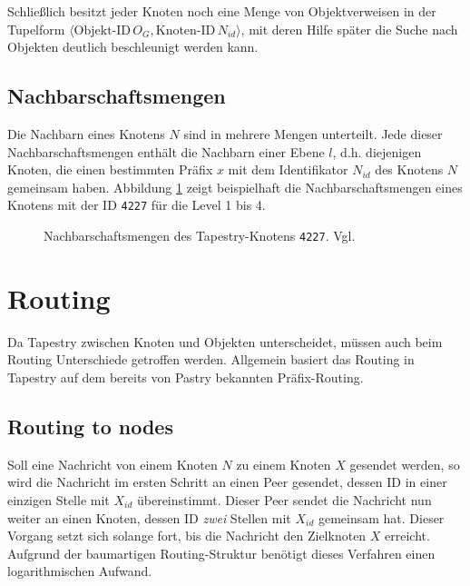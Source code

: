Schließlich besitzt jeder Knoten noch eine Menge von Objektverweisen in der 
Tupelform $\langle \text{Objekt-ID} \, O_G, \text{Knoten-ID} \, N_{id} 
\rangle$, mit deren Hilfe später die Suche nach Objekten deutlich beschleunigt 
werden kann.

\subsection{Nachbarschaftsmengen}
Die Nachbarn eines Knotens $N$ sind in mehrere Mengen unterteilt. Jede dieser 
Nachbarschaftsmengen enthält die Nachbarn einer Ebene $l$, d.h. diejenigen 
Knoten, die einen bestimmten Präfix $x$ mit dem Identifikator $N_{id}$ des 
Knotens $N$ gemeinsam haben. Abbildung \ref{fig:tapestry-neighbor-map} zeigt 
beispielhaft die Nachbarschaftsmengen eines Knotens mit der ID \texttt{4227} 
für die Level 1 bis 4.

\begin{figure}
  \centering
  \def\JPicScale{0.42}
  
  \caption[Tapestry: Nachbarschaftsmengen]{Nachbarschaftsmengen des
  Tapestry-Knotens \texttt{4227}. Vgl. \cite[Fig. 1]{TapestryTR}}
  \label{fig:tapestry-neighbor-map}
\end{figure}

% 

\section{Routing}
Da Tapestry zwischen Knoten und Objekten unterscheidet, müssen auch beim 
Routing Unterschiede getroffen werden. Allgemein basiert das Routing in 
Tapestry auf dem bereits von Pastry bekannten Präfix-Routing.

\subsection{Routing to nodes}
Soll eine Nachricht von einem Knoten $N$ zu einem Knoten $X$ gesendet werden, 
so wird die Nachricht im ersten Schritt an einen Peer gesendet, dessen ID in 
einer einzigen Stelle mit $X_{id}$ übereinstimmt. Dieser Peer sendet die 
Nachricht nun weiter an einen Knoten, dessen ID \textsl{zwei} Stellen mit 
$X_{id}$ gemeinsam hat. Dieser Vorgang setzt sich solange fort, bis die 
Nachricht den Zielknoten $X$ erreicht. Aufgrund der baumartigen 
Routing-Struktur benötigt dieses Verfahren einen logarithmischen Aufwand.

